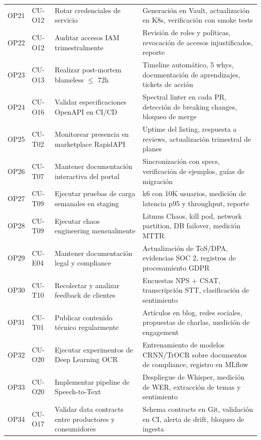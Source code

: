 ﻿\documentclass[11pt, letterpaper]{article}
\begin{document}
\begin{longtable}{>{\raggedright\arraybackslash}p{0.8cm} >{\raggedright\arraybackslash}p{2.2cm} >{\raggedright\arraybackslash}p{7.8cm} >{\raggedright\arraybackslash}p{4.8cm}}
OP21 & CU-O12 & Rotar credenciales de servicio & Generación en Vault, actualización en K8s, verificación con smoke tests \\

OP22 & CU-O12 & Auditar accesos IAM trimestralmente & Revisión de roles y políticas, revocación de accesos injustificados, reporte \\

OP23 & CU-O13 & Realizar post-mortem blameless $\le$ 72h & Timeline automático, 5 whys, documentación de aprendizajes, tickets de acción \\

OP24 & CU-O16 & Validar especificaciones OpenAPI en CI/CD & Spectral linter en cada PR, detección de breaking changes, bloqueo de merge \\

OP25 & CU-T02 & Monitorear presencia en marketplace RapidAPI & Uptime del listing, respuesta a reviews, actualización trimestral de planes \\

OP26 & CU-T07 & Mantener documentación interactiva del portal & Sincronización con specs, verificación de ejemplos, guías de migración \\

OP27 & CU-T09 & Ejecutar pruebas de carga semanales en staging & k6 con 10K usuarios, medición de latencia p95 y throughput, reporte \\

OP28 & CU-T09 & Ejecutar chaos engineering mensualmente & Litmus Chaos, kill pod, network partition, DB failover, medición MTTR \\

OP29 & CU-E04 & Mantener documentación legal y compliance & Actualización de ToS/DPA, evidencias SOC 2, registros de procesamiento GDPR \\

OP30 & CU-T10 & Recolectar y analizar feedback de clientes & Encuestas NPS + CSAT, transcripción STT, clasificación de sentimiento \\

OP31 & CU-T01 & Publicar contenido técnico regularmente & Artículos en blog, redes sociales, propuestas de charlas, medición de engagement \\

OP32 & CU-O20 & Ejecutar experimentos de Deep Learning OCR & Entrenamiento de modelos CRNN/TrOCR sobre documentos de compliance, registro en MLflow \\

OP33 & CU-O20 & Implementar pipeline de Speech-to-Text & Despliegue de Whisper, medición de WER, extracción de temas y sentimiento \\

OP34 & CU-O17 & Validar data contracts entre productores y consumidores & Schema contracts en Git, validación en CI, alerta de drift, bloqueo de ingesta \\

\end{longtable}
\end{document}
